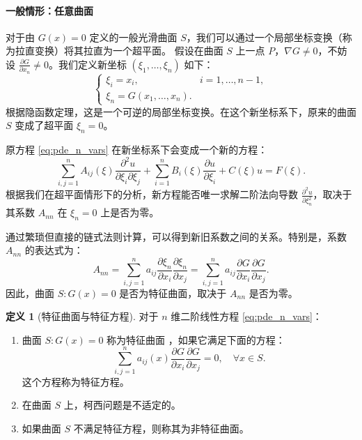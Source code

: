 \documentclass[12pt,a4paper]{article}
\numberwithin{subsection}{section}   %
\numberwithin{subsubsection}{subsection}
\theoremstyle{plain}
\theoremstyle{definition}
\newtheorem{definition}[theorem]{定义}
\theoremstyle{remark}
\theoremstyle{remark}
\begin{document}
	\paragraph{一般情形：任意曲面}
	对于由 \(G(x)=0\) 定义的一般光滑曲面 \(S\)，我们可以通过一个局部坐标变换（称为拉直变换）将其拉直为一个超平面。
	假设在曲面 \(S\) 上一点 \(P\)，\(\nabla G \neq 0\)，不妨设 \(\frac{\partial G}{\partial x_n} \neq 0\)。我们定义新坐标 \((\xi_1, \dots, \xi_n)\) 如下：
	\begin{equation}
		\begin{cases}
			\xi_i = x_i, & i=1, \dots, n-1, \\
			\xi_n = G(x_1, \dots, x_n).
		\end{cases}
	\end{equation}
	根据隐函数定理，这是一个可逆的局部坐标变换。在这个新坐标系下，原来的曲面 \(S\) 变成了超平面 \(\xi_n = 0\)。
	
	原方程 \eqref{eq:pde_n_vars} 在新坐标系下会变成一个新的方程：
	\[
	\sum_{i,j=1}^{n} A_{ij}(\xi) \frac{\partial^2 u}{\partial \xi_i \partial \xi_j} + \sum_{i=1}^{n} B_i(\xi) \frac{\partial u}{\partial \xi_i} + C(\xi) u = F(\xi).
	\]
	根据我们在超平面情形下的分析，新方程能否唯一求解二阶法向导数 \(\frac{\partial^2 u}{\partial \xi_n^2}\)，取决于其系数 \(A_{nn}\) 在 \(\xi_n=0\) 上是否为零。
	
	通过繁琐但直接的链式法则计算，可以得到新旧系数之间的关系。特别是，系数 \(A_{nn}\) 的表达式为：
	\[
	A_{nn} = \sum_{i,j=1}^{n} a_{ij} \frac{\partial \xi_n}{\partial x_i} \frac{\partial \xi_n}{\partial x_j} = \sum_{i,j=1}^{n} a_{ij} \frac{\partial G}{\partial x_i} \frac{\partial G}{\partial x_j}.
	\]
	因此，曲面 \(S: G(x)=0\) 是否为特征曲面，取决于 \(A_{nn}\) 是否为零。
	
	\begin{definition}[特征曲面与特征方程]
		对于 \(n\) 维二阶线性方程 \eqref{eq:pde_n_vars}：
		\begin{enumerate}[label=(\roman*)]
			\item 曲面 \(S: G(x)=0\) 称为特征曲面 ，如果它满足下面的方程：
			\begin{equation}\label{eq:char_surface_n_dim}
				\sum_{i,j=1}^{n} a_{ij}(x) \frac{\partial G}{\partial x_i} \frac{\partial G}{\partial x_j} = 0, \quad \forall x \in S.
			\end{equation}
			这个方程称为特征方程。
			\item 在曲面 \(S\) 上，柯西问题是不适定的。
			\item 如果曲面 \(S\) 不满足特征方程，则称其为非特征曲面。
		\end{enumerate}
	\end{definition}
	
\end{document}
